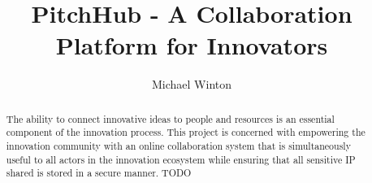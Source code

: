 \documentclass[11pt
              , a4paper
              , twoside
              , openright
              ]{report}
\title{PitchHub - A Collaboration Platform for Innovators}
\author{Michael Winton}
\date{}
\begin{document}
\frontmatter



\begin{abstract}

The ability to connect innovative ideas to people and resources is an essential component of the innovation process. This project is concerned with empowering the innovation community with an online collaboration system that is simultaneously useful to all actors in the innovation ecosystem while ensuring that all sensitive IP shared is stored in a secure manner. TODO

\end{abstract}


\maketitle

% 

\tableofcontents



\mainmatter













% 
% 


\backmatter





\end{document}
